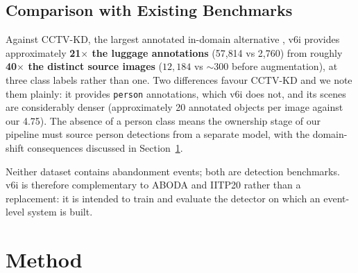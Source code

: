 \documentclass[10pt,twocolumn,a4paper]{article}
\begin{document}
\subsection{Comparison with Existing Benchmarks}

Against CCTV-KD, the largest annotated in-domain alternative
\cite{vrsalovic2025sensors}, v6i provides approximately \textbf{21$\times$ the
luggage annotations} (57{,}814 vs 2{,}760) from roughly \textbf{40$\times$ the
distinct source images} ($12{,}184$ vs $\sim$300 before augmentation), at three
class labels rather than one. Two differences favour CCTV-KD and we note them
plainly: it provides \texttt{person} annotations, which v6i does not, and its
scenes are considerably denser (approximately 20 annotated objects per image
against our 4.75). The absence of a person class means the ownership stage of our
pipeline must source person detections from a separate model, with the
domain-shift consequences discussed in Section~\ref{sec:method}.

Neither dataset contains abandonment events; both are detection benchmarks. v6i
is therefore complementary to ABODA and IITP20 rather than a replacement: it is
intended to train and evaluate the detector on which an event-level system is
built.

\section{Method}
\label{sec:method}
\end{document}
